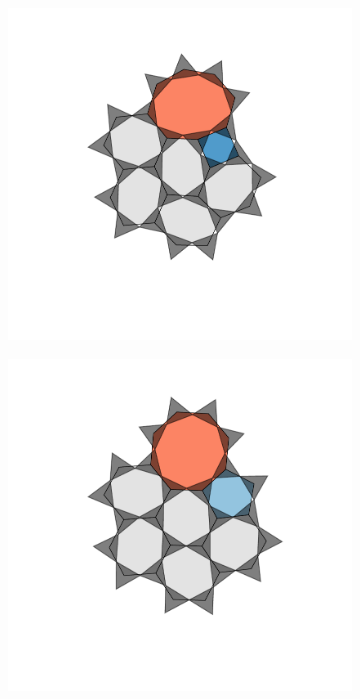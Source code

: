 \begin{figure}[bt]
     \begin{subfigure}[b]{0.18\textwidth}
         \centering
         \includegraphics[width=\textwidth]{./figures/bilayers/alg_4.pdf}
         \caption{}
         \label{fig:triraftalgtrial1}
     \end{subfigure}
     \hfill
     \begin{subfigure}[b]{0.18\textwidth}
         \centering
         \includegraphics[width=\textwidth]{./figures/bilayers/alg_5.pdf}

\end{subfigure}
\end{figure}
